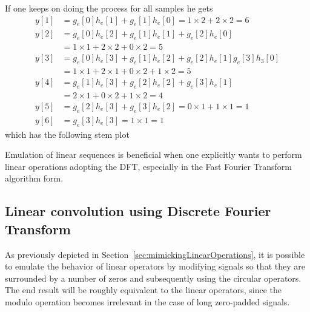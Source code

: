 \documentclass[\documentfontsize, twocolumn]{\classname}
\begin{document}
If one keeps on doing the process for all samples he gets
\begin{align*}
    y[1] &= g_e[0]h_e[1] + g_e[1]h_e[0] = 1 \times 2 + 2 \times 2 = 6\\
    y[2] &= g_e[0]h_e[2] + g_e[1]h_e[1] + g_e[2] h_e[0]\\ 
         &= 1 \times 1 + 2 \times 2 + 0 \times 2 = 5\\
    y[3] &= g_e[0]h_e[3] + g_e[1]h_e[2] + g_e[2] h_e[1] g_e[3]h_3[0]\\ 
         &= 1 \times 1 + 2 \times 1 + 0 \times 2 + 1 \times 2 = 5\\
    y[4] &= g_e[1]h_e[3] + g_e[2]h_e[2] + g_e[3] h_e[1]\\ 
         &= 2 \times 1 + 0 \times 2 + 1 \times 2 = 4\\
    y[5] &= g_e[2]h_e[3] + g_e[3]h_e[2] = 0 \times 1 + 1 \times 1 = 1\\
    y[6] &= g_e[3]h_e[3] = 1 \times 1 = 1
\end{align*}
which has the following stem plot
\begin{center}
\end{center}

Emulation of linear sequences is beneficial when one explicitly wants to perform linear operations adopting the DFT, especially in the Fast Fourier Transform algorithm form.

\subsection{Linear convolution using Discrete Fourier Transform}
As previously depicted in Section~\ref{sec:mimickingLinearOperations}, it is possible to emulate the behavior of linear operators by modifying signals so that they are surrounded by a number of zeros and subsequently using the circular operators. The end result will be roughly equivalent to the linear operators, since the modulo operation becomes irrelevant in the case of long zero-padded signals.
\end{document}
